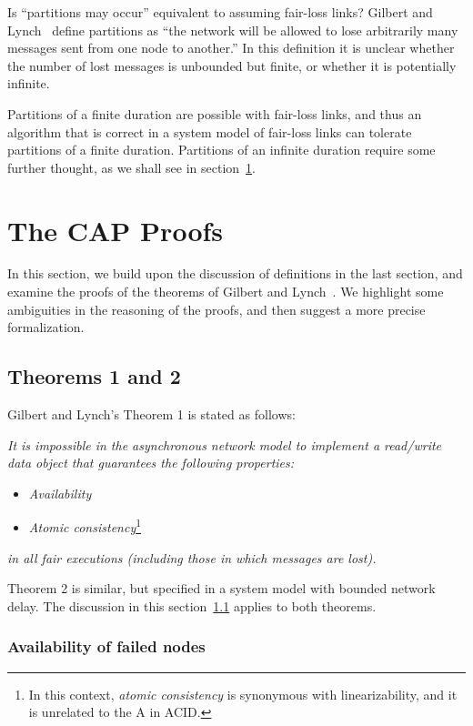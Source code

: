 \documentclass[a4paper,twocolumn,10pt]{article}
\begin{document}
Is ``partitions may occur'' equivalent to assuming fair-loss links? Gilbert and
Lynch~\cite{Gilbert2002il} define partitions as ``the network will be allowed to lose arbitrarily
many messages sent from one node to another.'' In this definition it is unclear whether the number
of lost messages is unbounded but finite, or whether it is potentially infinite.

Partitions of a finite duration are possible with fair-loss links, and thus an algorithm that is
correct in a system model of fair-loss links can tolerate partitions of a finite duration.
Partitions of an infinite duration require some further thought, as we shall see in
section~\ref{sec:proofs}.

\section{The CAP Proofs}\label{sec:proofs}

In this section, we build upon the discussion of definitions in the last section, and examine the
proofs of the theorems of Gilbert and Lynch~\cite{Gilbert2002il}. We highlight some ambiguities in
the reasoning of the proofs, and then suggest a more precise formalization.

\subsection{Theorems 1 and 2}\label{sec:theorem1}

Gilbert and Lynch's Theorem 1 is stated as follows:

\emph{It is impossible in the asynchronous network model to implement a read/write data object that
guarantees the following properties:}
\begin{itemize}
\item \emph{Availability}
\item \emph{Atomic consistency}\footnote{In this context, \emph{atomic consistency} is synonymous
with linearizability, and it is unrelated to the A in ACID.}
\end{itemize}
\emph{in all fair executions (including those in which messages are lost).}

Theorem 2 is similar, but specified in a system model with bounded network delay. The discussion in
this section~\ref{sec:theorem1} applies to both theorems.

\subsubsection{Availability of failed nodes}\label{sec:failed-node-trivial}
\end{document}
